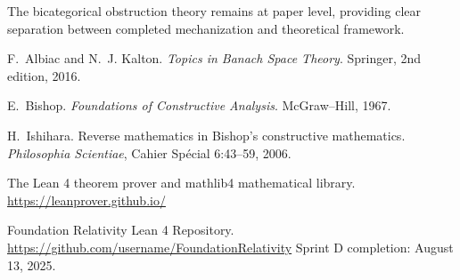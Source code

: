 \documentclass[11pt]{article}
\theoremstyle{definition}
\theoremstyle{remark}
\begin{document}
The bicategorical obstruction theory remains at paper level, providing clear separation between completed mechanization and theoretical framework.

\begin{thebibliography}{10}

F.~Albiac and N.~J. Kalton.
\newblock \emph{Topics in Banach Space Theory}.
\newblock Springer, 2nd edition, 2016.

E.~Bishop.
\newblock \emph{Foundations of Constructive Analysis}.
\newblock McGraw--Hill, 1967.

H.~Ishihara.
\newblock Reverse mathematics in Bishop's constructive mathematics.
\newblock \emph{Philosophia Scientiae}, Cahier Spécial 6:43--59, 2006.

The Lean 4 theorem prover and mathlib4 mathematical library.
\newblock \url{https://leanprover.github.io/}

Foundation Relativity Lean 4 Repository.
\newblock \url{https://github.com/username/FoundationRelativity}
\newblock Sprint D completion: August 13, 2025.

\end{thebibliography}
\end{document}
